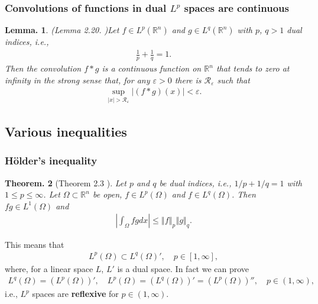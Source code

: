 \documentclass[openany, a4paper, oneside]{jsbook}
\theoremstyle{break}
\newtheorem{thm}{Theorem.}[section]
\newtheorem{lem}[thm]{Lemma.}
\theoremstyle{breakdefn}
\newcommand{\abs}[1]{\left|#1\right|}
\newcommand{\norm}[1]{\left\Vert#1\right\Vert}
\newcommand{\rbk}[1]{\left (#1\right)}
\newcommand{\bbRn}{\mathbb{R}^n}
\newcommand{\calR}{\mathcal{R}}
\begin{document}
\subsubsection{Convolutions of functions in dual $L^p$ spaces are continuous}


      \begin{lem}\textup{(Lemma 2.20. \cite{LiebLoss1})}\label{Lieb-Loss_Analysis_chap11_41}
 Let $f \in L^p \rbk{\bbRn}$ and $g \in L^q (\bbRn)$ with $p$, $q > 1$ dual indices, i.e.,
 \begin{align}
  \frac{1}{p} + \frac{1}{q} = 1.
 \end{align}
 Then the convolution $f*g$ is a continuous function on $\bbRn$ that tends to zero at infinity in the strong sense that,
 for any $\varepsilon > 0$ there is $\calR_{\varepsilon}$ such that
 \begin{align}
  \sup_{\abs{x} > \calR_{\varepsilon}} \abs{(f*g) (x)} < \varepsilon.
 \end{align}
\end{lem}
\subsection{Various inequalities}

\subsubsection{H\"older's inequality}


\begin{thm}[Theorem 2.3 \cite{LiebLoss1}]
 Let $p$ and $q$ be dual indices, i.e., $1/p + 1/q = 1$ with $1 \leq p \leq \infty$.
 Let $\Omega \subset \bbRn$ be open, $f \in L^p (\Omega)$ and $f \in L^q \rbk{\Omega}$.
 Then $fg \in L^1 (\Omega)$ and
 \begin{align}
  \abs{\int_{\Omega} fg dx}
  \leq
  \norm{f}_p \norm{g}_q.
 \end{align}
\end{thm}
This means that
\begin{align}
 L^p \rbk{\Omega} \subset L^q \rbk{\Omega}', \quad p \in [1, \infty],
\end{align}
where, for a linear space $L$, $L'$ is a dual space.
In fact we can prove
\begin{align}
 L^q \rbk{\Omega} = \rbk{L^p \rbk{\Omega}}', \quad
 L^p \rbk{\Omega} = \rbk{L^q \rbk{\Omega}}' = \rbk{L^p \rbk{\Omega}}'', \quad
 p \in (1, \infty),
\end{align}
i.e., $L^p$ spaces are \textbf{reflexive} for $p \in (1, \infty)$.
\end{document}
